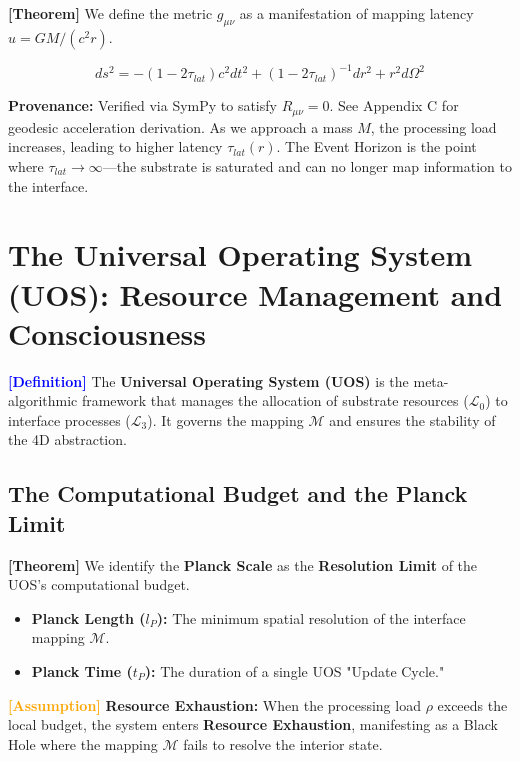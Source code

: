 \documentclass[11pt,titlepage]{article}
\newcommand{\substrate}{\mathcal{L}_0}
\newcommand{\interface}{\mathcal{L}_3}
\newcommand{\tagdef}{\textcolor{blue}{\textbf{[Definition]}} }
\newcommand{\tagass}{\textcolor{orange}{\textbf{[Assumption]}} }
\newcommand{\tagtheo}{\textcolor{green!60!black}{\textbf{[Theorem]}} }
\begin{document}
\tagtheo We define the metric $g_{\mu\nu}$ as a manifestation of mapping latency $u = GM/(c^2 r)$.

\begin{equation}
ds^2 = -(1 - 2\tau_{lat})c^2 dt^2 + (1 - 2\tau_{lat})^{-1} dr^2 + r^2 d\Omega^2
\end{equation}

\textbf{Provenance:} Verified via SymPy to satisfy $R_{\mu\nu} = 0$. See Appendix C for geodesic acceleration derivation. As we approach a mass $M$, the processing load increases, leading to higher latency $\tau_{lat}(r)$. The Event Horizon is the point where $\tau_{lat} \to \infty$---the substrate is saturated and can no longer map information to the interface.

\section{The Universal Operating System (UOS): Resource Management and Consciousness}
\label{sec:uos}
\tagdef The \textbf{Universal Operating System (UOS)} is the meta-algorithmic framework that manages the allocation of substrate resources ($\substrate$) to interface processes ($\interface$). It governs the mapping $\mathcal{M}$ and ensures the stability of the 4D abstraction.

\subsection{The Computational Budget and the Planck Limit}
\tagtheo We identify the \textbf{Planck Scale} as the \textbf{Resolution Limit} of the UOS's computational budget. 
\begin{itemize}
    
\item \textbf{Planck Length ($l_P$):} The minimum spatial resolution of the interface mapping $\mathcal{M}$.
    
\item \textbf{Planck Time ($t_P$):} The duration of a single UOS "Update Cycle."
\end{itemize}
\tagass \textbf{Resource Exhaustion:} When the processing load $\rho$ exceeds the local budget, the system enters \textbf{Resource Exhaustion}, manifesting as a Black Hole where the mapping $\mathcal{M}$ fails to resolve the interior state.
\end{document}
